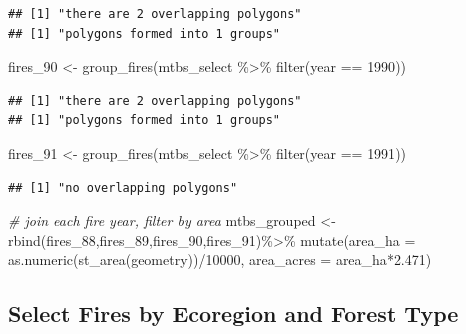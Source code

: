 \documentclass[
]{book}
\newenvironment{Shaded}{\begin{snugshade}}{\end{snugshade}}
\newcommand{\AttributeTok}[1]{\textcolor[rgb]{0.77,0.63,0.00}{#1}}
\newcommand{\CommentTok}[1]{\textcolor[rgb]{0.56,0.35,0.01}{\textit{#1}}}
\newcommand{\DecValTok}[1]{\textcolor[rgb]{0.00,0.00,0.81}{#1}}
\newcommand{\FloatTok}[1]{\textcolor[rgb]{0.00,0.00,0.81}{#1}}
\newcommand{\FunctionTok}[1]{\textcolor[rgb]{0.00,0.00,0.00}{#1}}
\newcommand{\NormalTok}[1]{#1}
\newcommand{\OtherTok}[1]{\textcolor[rgb]{0.56,0.35,0.01}{#1}}
\newcommand{\SpecialCharTok}[1]{\textcolor[rgb]{0.00,0.00,0.00}{#1}}
\begin{document}
\begin{verbatim}
## [1] "there are 2 overlapping polygons"
## [1] "polygons formed into 1 groups"
\end{verbatim}

\begin{Shaded}
\begin{Highlighting}[]
\NormalTok{fires\_90 }\OtherTok{\textless{}{-}} \FunctionTok{group\_fires}\NormalTok{(mtbs\_select }\SpecialCharTok{\%\textgreater{}\%}  \FunctionTok{filter}\NormalTok{(year }\SpecialCharTok{==} \DecValTok{1990}\NormalTok{))}
\end{Highlighting}
\end{Shaded}

\begin{verbatim}
## [1] "there are 2 overlapping polygons"
## [1] "polygons formed into 1 groups"
\end{verbatim}

\begin{Shaded}
\begin{Highlighting}[]
\NormalTok{fires\_91 }\OtherTok{\textless{}{-}} \FunctionTok{group\_fires}\NormalTok{(mtbs\_select }\SpecialCharTok{\%\textgreater{}\%}  \FunctionTok{filter}\NormalTok{(year }\SpecialCharTok{==} \DecValTok{1991}\NormalTok{))}
\end{Highlighting}
\end{Shaded}

\begin{verbatim}
## [1] "no overlapping polygons"
\end{verbatim}

\begin{Shaded}
\begin{Highlighting}[]
\CommentTok{\# join each fire year, filter by area}
\NormalTok{mtbs\_grouped }\OtherTok{\textless{}{-}} \FunctionTok{rbind}\NormalTok{(fires\_88,fires\_89,fires\_90,fires\_91)}\SpecialCharTok{\%\textgreater{}\%}
  \FunctionTok{mutate}\NormalTok{(}\AttributeTok{area\_ha =} \FunctionTok{as.numeric}\NormalTok{(}\FunctionTok{st\_area}\NormalTok{(geometry))}\SpecialCharTok{/}\DecValTok{10000}\NormalTok{,}
         \AttributeTok{area\_acres =}\NormalTok{ area\_ha}\SpecialCharTok{*}\FloatTok{2.471}\NormalTok{)}
\end{Highlighting}
\end{Shaded}

\hypertarget{select-fires-by-ecoregion-and-forest-type}{%
\subsection{Select Fires by Ecoregion and Forest Type}\label{select-fires-by-ecoregion-and-forest-type}}
\end{document}
